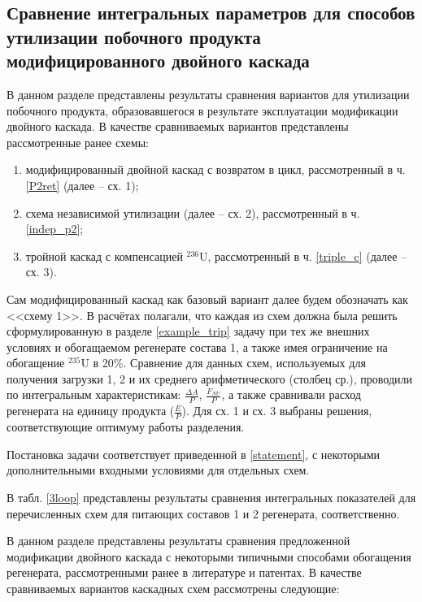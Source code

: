 {%


\subsection{Сравнение интегральных параметров для способов утилизации побочного продукта модифицированного двойного каскада}

В данном разделе представлены результаты сравнения вариантов для утилизации побочного продукта, образовавшегося в результате эксплуатации модификации двойного каскада. В качестве сравниваемых вариантов представлены  рассмотренные ранее схемы: 

\begin{enumerate}
    \item модифицированный двойной каскад с возвратом в цикл, рассмотренный в ч. \ref{P2ret} (далее -- сх. 1);
    \item схема независимой утилизации (далее -- сх. 2), рассмотренный в ч. \ref{indep_p2};
    \item тройной каскад с компенсацией $^{236}$U, рассмотренный в ч. \ref{triple_c} (далее -- сх. 3).
\end{enumerate}

Сам модифицированный каскад как базовый вариант далее будем обозначать как <<схему 1>>. В расчётах полагали, что каждая из схем должна была решить сформулированную в разделе \ref{example_trip} задачу при тех же внешних условиях и обогащаемом регенерате состава 1, а также имея ограничение на обогащение $^{235}$U в 20\%. Сравнение для данных схем, используемых для получения загрузки 1, 2 и их среднего арифметического (столбец ср.), проводили по интегральным характеристикам: $\frac{\Delta A}{P}$, $\frac{F_{NU}}{P}$, а также сравнивали расход регенерата на единицу продукта ($\frac{E}{P}$). Для сх. 1 и сх. 3 выбраны решения, соответствующие оптимуму работы разделения.

Постановка задачи соответствует приведенной в \ref{statement}, с некоторыми дополнительными входными условиями для отдельных схем.

В табл. \ref{3loop} представлены результаты сравнения интегральных показателей для перечисленных схем для питающих составов 1 и 2 регенерата, соответственно.


В данном разделе представлены результаты сравнения предложенной модификации двойного каскада с некоторыми типичными способами обогащения регенерата, рассмотренными ранее в литературе и патентах. В качестве сравниваемых вариантов каскадных схем рассмотрены следующие: 

}

